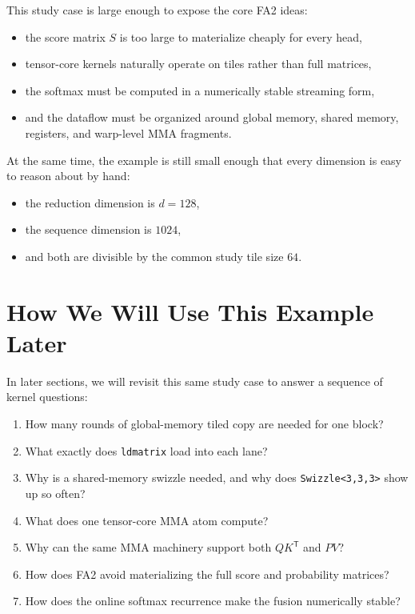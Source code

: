 \documentclass[11pt]{article}
\newcommand{\trans}{\mathsf{T}}
\begin{document}
This study case is large enough to expose the core FA2 ideas:

\begin{itemize}
    \item the score matrix $S$ is too large to materialize cheaply for every
    head,
    \item tensor-core kernels naturally operate on tiles rather than full
    matrices,
    \item the softmax must be computed in a numerically stable streaming form,
    \item and the dataflow must be organized around global memory, shared
    memory, registers, and warp-level MMA fragments.
\end{itemize}

At the same time, the example is still small enough that every dimension is easy
to reason about by hand:

\begin{itemize}
    \item the reduction dimension is $d = 128$,
    \item the sequence dimension is $1024$,
    \item and both are divisible by the common study tile size $64$.
\end{itemize}

\section{How We Will Use This Example Later}

In later sections, we will revisit this same study case to answer a sequence of
kernel questions:

\begin{enumerate}
    \item How many rounds of global-memory tiled copy are needed for one block?
    \item What exactly does \texttt{ldmatrix} load into each lane?
    \item Why is a shared-memory swizzle needed, and why does
    \texttt{Swizzle<3,3,3>} show up so often?
    \item What does one tensor-core MMA atom compute?
    \item Why can the same MMA machinery support both $QK^\trans$ and $PV$?
    \item How does FA2 avoid materializing the full score and probability
    matrices?
    \item How does the online softmax recurrence make the fusion numerically
    stable?
\end{enumerate}
\end{document}
